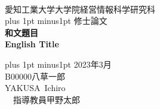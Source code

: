 \begin{titlepage}
    \begin{center}

        \ \vspace{19mm}

        \LARGE\baselineskip=13mm
        愛知工業大学大学院経営情報科学研究科 \\
        \kanjiskip=12pt plus 1pt minus1pt
        修士論文 \\[1mm]

        {\Huge\baselineskip=13mm
        \textbf{和文題目} \\
        \textbf{English Title} \\
        }

        \vspace{80mm}

        \kanjiskip=9pt plus 1pt minus1pt
        2023年3月 \\
        B00000\hspace{1zw}八草一郎 \\
        YAKUSA\ Ichiro \\
        \ \hbox{\kanjiskip=0pt 指導教員}\hspace{1zw}甲野太郎\hspace{1zw}

    \end{center}
\end{titlepage}
